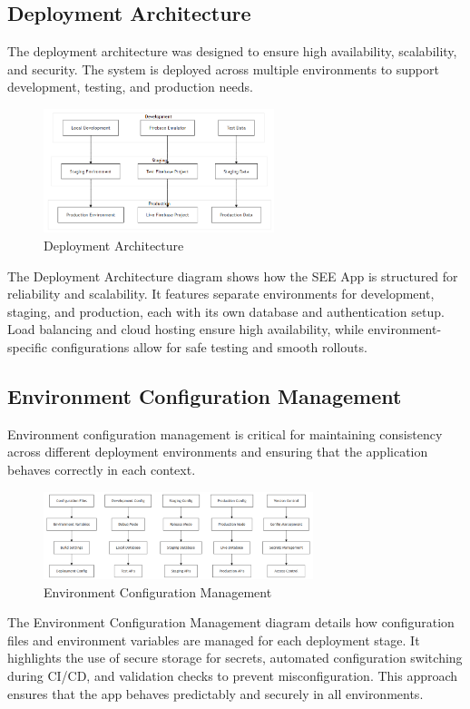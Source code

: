 \documentclass[12pt,a4paper]{article}
\newcommand{\sectiontitle}[1]{\subsection{#1}}
\begin{document}
\sectiontitle{Deployment Architecture}

The deployment architecture was designed to ensure high availability, scalability, and security. The system is deployed across multiple environments to support development, testing, and production needs.

\begin{figure}[H]
    \centering
    \includegraphics[width=0.6\textwidth,height=0.21\textwidth,keepaspectratio]{redrawn_diagrams/Figure6_Deployment_Architecture.png}
    \caption{Deployment Architecture}
    \label{fig:deployment}
\end{figure}
\vspace{0.5em}
The Deployment Architecture diagram shows how the SEE App is structured for reliability and scalability. It features separate environments for development, staging, and production, each with its own database and authentication setup. Load balancing and cloud hosting ensure high availability, while environment-specific configurations allow for safe testing and smooth rollouts.

\sectiontitle{Environment Configuration Management}

Environment configuration management is critical for maintaining consistency across different deployment environments and ensuring that the application behaves correctly in each context.

\begin{figure}[H]
    \centering
    \includegraphics[width=0.7\textwidth,height=0.23\textwidth,keepaspectratio]{redrawn_diagrams/Figure7_Environment_Config.png}
    \caption{Environment Configuration Management}
    \label{fig:env-config}
\end{figure}
\vspace{0.5em}
The Environment Configuration Management diagram details how configuration files and environment variables are managed for each deployment stage. It highlights the use of secure storage for secrets, automated configuration switching during CI/CD, and validation checks to prevent misconfiguration. This approach ensures that the app behaves predictably and securely in all environments.
\end{document}
